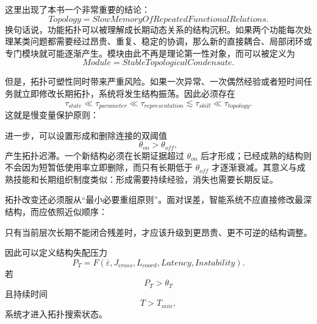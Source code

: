 这里出现了本书一个非常重要的结论：
\begin{equation}
\boxed{
Topology
=
SlowMemoryOfRepeatedFunctionalRelations.
}
\end{equation}
换句话说，功能拓扑可以被理解成长期动态关系的结构沉积。如果两个功能每次处理某类问题都需要经过昂贵、重复、稳定的协调，那么新的直接耦合、局部闭环或专门模块就可能逐渐产生。模块由此不再是理论第一性对象，而可以被定义为
\begin{equation}
\boxed{
Module
=
StableTopologicalCondensate.
}
\end{equation}

但是，拓扑可塑性同时带来严重风险。如果一次异常、一次偶然经验或者短时间任务就立即修改长期拓扑，系统将发生结构振荡。因此必须存在
\begin{equation}
\tau_{state}
\ll
\tau_{parameter}
\ll
\tau_{representation}
\lesssim
\tau_{skill}
\ll
\tau_{topology}.
\end{equation}
这就是慢变量保护原则：
\begin{statementbox}
\centering
{}
\end{statementbox}

进一步，可以设置形成和删除连接的双阈值
\begin{equation}
\theta_{on}
>
\theta_{off},
\end{equation}
产生拓扑迟滞。一个新结构必须在长期证据超过 $\theta_{on}$ 后才形成；已经成熟的结构则不会因为短暂低使用率立即删除，而只有长期低于 $\theta_{off}$ 才逐渐衰减。其意义与成熟技能和长期组织制度类似：形成需要持续经验，消失也需要长期反证。

拓扑改变还必须服从“最小必要重组原则”。面对误差，智能系统不应直接修改最深结构，而应依照近似顺序：
\begin{statementbox}
\centering
{}
\end{statementbox}
只有当前层次长期不能闭合残差时，才应该升级到更昂贵、更不可逆的结构调整。

因此可以定义结构失配压力
\begin{equation}
P_T
=
F
\left(
\overline{\varepsilon},
J_{cross},
L_{coord},
Latency,
Instability
\right).
\end{equation}
若
\begin{equation}
P_T>\theta_T
\end{equation}
且持续时间
\begin{equation}
T>T_{min},
\end{equation}
系统才进入拓扑搜索状态。

